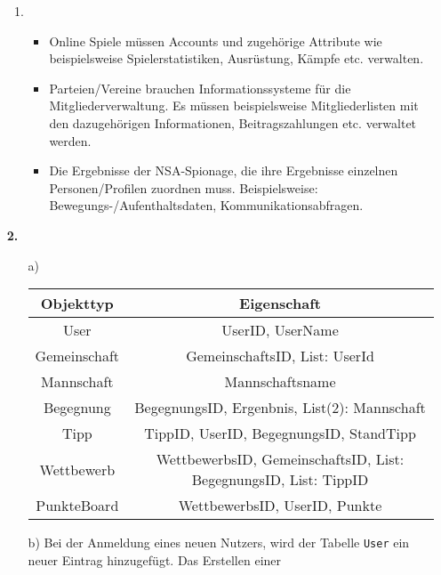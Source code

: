 \documentclass[a4paper,11pt,fleqn]{scrartcl}
\begin{document}
\begin{enumerate}
\begin{enumerate}
                \item \begin{itemize}
                            \item Online Spiele müssen Accounts und zugehörige Attribute wie beispielsweise Spielerstatistiken,
                            Ausrüstung, Kämpfe etc. verwalten.  
                            \item Parteien/Vereine brauchen Informationssysteme für die Mitgliederverwaltung.
                            Es müssen beispielsweise Mitgliederlisten mit den dazugehörigen Informationen, Beitragszahlungen 
                            etc. verwaltet werden. 
                            \item Die Ergebnisse der NSA-Spionage, die ihre Ergebnisse einzelnen Personen/Profilen zuordnen
                             muss. Beispielsweise: Bewegungs-/Aufenthaltsdaten, Kommunikationsabfragen. \\
                       \end{itemize}
            \end{enumerate}  
        \item[\textbf{2.}]
        \begin{enumerate}
            \item[a)]\quad \\
            \begin{tabular}{c|c}
                Objekttyp & Eigenschaft \\ \hline\hline
                User & UserID, UserName \\ \hline 
                Gemeinschaft & GemeinschaftsID, List: UserId \\ \hline
                Mannschaft & Mannschaftsname\\ \hline
                Begegnung & BegegnungsID, Ergenbnis, List(2): Mannschaft \\ \hline
                Tipp & TippID, UserID, BegegnungsID, StandTipp\\ \hline 
                   Wettbewerb & WettbewerbsID, GemeinschaftsID, List: BegegnungsID, List: TippID\\ \hline
                PunkteBoard & WettbewerbsID, UserID, Punkte\\ \hline 
            \end{tabular}
            \newpage
            \item[b)]%
            Bei der Anmeldung eines neuen Nutzers, wird der Tabelle \texttt{User} ein neuer Eintrag hinzugefügt. Das Erstellen einer

\end{enumerate}
\end{enumerate}
\end{document}
